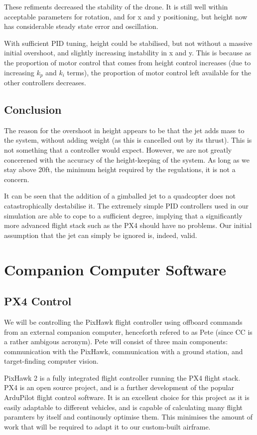 \documentclass[11pt]{article}
\begin{document}
These refiments decreased the stability of the drone. It is still well within acceptable parameters for rotation, and for x and y positioning, but height now has considerable steady state error and oscillation.

With sufficient PID tuning, height could be stabilised, but not without a massive initial overshoot, and slightly increasing instability in x and y. This is because as the proportion of motor control that comes from height control increases (due to increasing $k_p$ and $k_i$ terms), the proportion of motor control left available for the other controllers decreases.

\subsection{Conclusion}
The reason for the overshoot in height appears to be that the jet adds mass to the system, without adding weight (as this is cancelled out by its thrust). This is not something that a controller would expect. However, we are not greatly concerened with the accuracy of the height-keeping of the system. As long as we stay above 20ft, the minimum height required by the regulations\cite{IMechE_rules}, it is not a concern.

It can be seen that the addition of a gimballed jet to a quadcopter does not catastrophically destabilise it. The extremely simple PID controllers used in our simulation are able to cope to a sufficient degree, implying that a significantly more advanced flight stack such as the PX4 should have no problems. Our initial assumption that the jet can simply be ignored is, indeed, valid.



\section{Companion Computer Software}
\subsection{PX4 Control}
We will be controlling the PixHawk flight controller using offboard commands from an external companion computer, henceforth refered to as Pete (since CC is a rather ambigous acronym). Pete will consist of three main components: communication with the PixHawk, communication with a ground station, and target-finding computer vision.

PixHawk 2 is a fully integrated flight controller running the PX4 flight stack. PX4 is an open source project, and is a further development of the popular ArduPilot flight control software. It is an excellent choice for this project as it is easily adaptable to different vehicles, and is capable of calculating many flight paramters by itself and continously optimise them. This minimises the amount of work that will be required to adapt it to our custom-built airframe.
\end{document}
